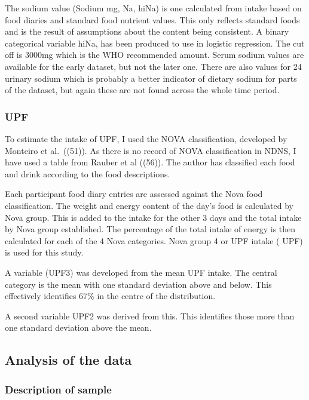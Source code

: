 \documentclass[
]{article}
\begin{document}
The sodium value (Sodium mg, Na, hiNa) is one calculated from intake
based on food diaries and standard food nutrient values. This only
reflects standard foods and is the result of assumptions about the
content being consistent. A binary categorical variable hiNa, has been
produced to use in logistic regression. The cut off is 3000mg which is
the WHO recommended amount. Serum sodium values are available for the
early dataset, but not the later one. There are also values for 24
urinary sodium which is probably a better indicator of dietary sodium
for parts of the dataset, but again these are not found across the whole
time period.

\hypertarget{upf-1}{%
\subsubsection{UPF}\label{upf-1}}

To estimate the intake of UPF, I used the NOVA classification, developed
by Monteiro et al.~((51)). As there is no record of NOVA classification
in NDNS, I have used a table from Rauber et al ((56)). The author has
classified each food and drink according to the food descriptions.

Each participant food diary entries are assessed against the Nova food
classification. The weight and energy content of the day's food is
calculated by Nova group. This is added to the intake for the other 3
days and the total intake by Nova group established. The percentage of
the total intake of energy is then calculated for each of the 4 Nova
categories. Nova group 4 or UPF intake ( UPF) is used for this study.

A variable (UPF3) was developed from the mean UPF intake. The central
category is the mean with one standard deviation above and below. This
effectively identifies 67\% in the centre of the distribution.

A second variable UPF2 was derived from this. This identifies those more
than one standard deviation above the mean.

\hypertarget{analysis-of-the-data}{%
\subsection{Analysis of the data}\label{analysis-of-the-data}}

\hypertarget{description-of-sample}{%
\subsubsection{Description of sample}\label{description-of-sample}}
\end{document}
